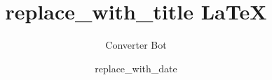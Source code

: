 \documentclass{article}
\begin{document}
\title{replace_with_title LaTeX}
\author{Converter Bot}
\date{replace_with_date}

\maketitle


\end{document}
